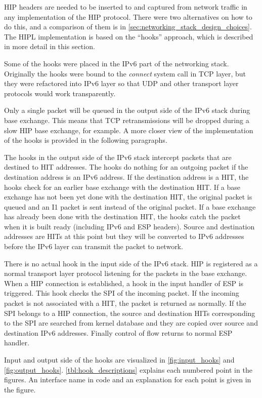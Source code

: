 HIP headers are needed to be inserted to and captured from network
traffic in any implementation of the HIP protocol. There were two
alternatives on how to do this, and a comparison of them is in
\autoref{sec:networking_stack_design_choices}. The HIPL implementation
is based on the ``hooks'' approach, which is described in more detail
in this section.

Some of the hooks were placed in the IPv6 part of the networking
stack. Originally the hooks were bound to the \textit{connect} system
call in TCP layer, but they were refactored into IPv6 layer so that
UDP and other transport layer protocols would work transparently.

Only a single packet will be queued in the output side of the IPv6
stack during base exchange. This means that TCP retransmissions will
be dropped during a slow HIP base exchange, for example. A more closer
view of the implementation of the hooks is provided in the following
paragraphs.

The hooks in the output side of the IPv6 stack intercept packets that
are destined to HIT addresses. The hooks do nothing for an outgoing
packet if the destination address is an IPv6 address. If the
destination address is a HIT, the hooks check for an earlier base
exchange with the destination HIT. If a base exchange has not been yet
done with the destination HIT, the original packet is queued and an I1
packet is sent instead of the original packet. If a base exchange has
already been done with the destination HIT, the hooks catch the packet
when it is built ready (including IPv6 and ESP headers). Source and
destination addresses are HITs at this point but they will be
converted to IPv6 addresses before the IPv6 layer can transmit the
packet to network.

There is no actual hook in the input side of the IPv6 stack. HIP is
registered as a normal transport layer protocol listening for the
packets in the base exchange. When a HIP connection is established, a
hook in the input handler of ESP is triggered. This hook checks the
SPI of the incoming packet. If the incoming packet is not associated
with a HIT, the packet is returned as normally. If the SPI belongs to
a HIP connection, the source and destination HITs corresponding to the
SPI are searched from kernel database and they are copied over source
and destination IPv6 addresses. Finally control of flow returns to
normal ESP handler.

Input and output side of the hooks are visualized in
\autoref{fig:input_hooks} and \autoref{fig:output_hooks}.
\autoref{tbl:hook_descriptions} explains each numbered point in the
figures. An interface name in code and an explanation for each point
is given in the figure.

